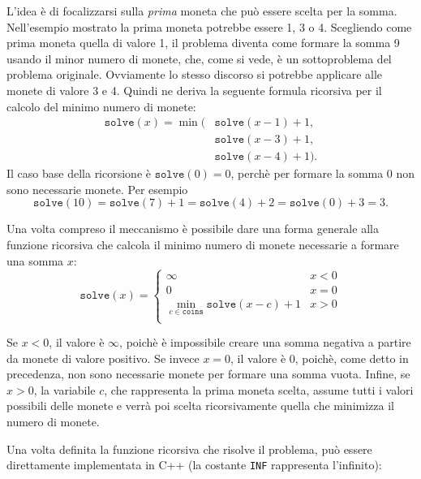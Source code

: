 L'idea è di focalizzarsi sulla \emph{prima}
moneta che può essere scelta per la somma.
Nell'esempio mostrato la prima moneta 
potrebbe essere 1, 3 o 4.
Scegliendo come prima moneta quella di valore 1,
il problema diventa come formare la somma 9
usando il minor numero di monete,
che, come si vede, è un sottoproblema del problema originale.
Ovviamente lo stesso discorso si potrebbe applicare
alle monete di valore 3 e 4.
Quindi ne deriva la seguente formula ricorsiva per
il calcolo del minimo numero di monete:
\begin{equation*}
\begin{split}
\texttt{solve}(x) = \min( & \texttt{solve}(x-1)+1, \\
                           & \texttt{solve}(x-3)+1, \\
                           & \texttt{solve}(x-4)+1).
\end{split}
\end{equation*}
Il caso base della ricorsione è $\texttt{solve}(0)=0$,
perchè per formare la somma 0 non sono necessarie monete.
Per esempio
\[ \texttt{solve}(10) = \texttt{solve}(7)+1 = \texttt{solve}(4)+2 = \texttt{solve}(0)+3 = 3.\]

Una volta compreso il meccanismo è possibile dare una forma
generale alla funzione ricorsiva che calcola il minimo
numero di monete necessarie a formare una somma $x$:
\begin{equation*}
    \texttt{solve}(x) = \begin{cases}
               \infty               & x < 0\\
               0               & x = 0\\
               \min_{c \in \texttt{coins}} \texttt{solve}(x-c)+1 & x > 0 \\
           \end{cases}
\end{equation*}

Se $x<0$, il valore è $\infty$,
poichè è impossibile creare una somma negativa
a partire da monete di valore positivo.
Se invece $x=0$, il valore è $0$,
poichè, come detto in precedenza,
non sono necessarie monete per formare
una somma vuota.
Infine, se $x>0$,
la variabile $c$, che rappresenta la prima moneta scelta,
assume tutti i valori possibili 
delle monete e verrà poi scelta ricorsivamente 
quella che minimizza il numero di monete.

Una volta definita la funzione ricorsiva che risolve il problema,
può essere direttamente implementata in C++
(la costante \texttt{INF} rappresenta l'infinito):

